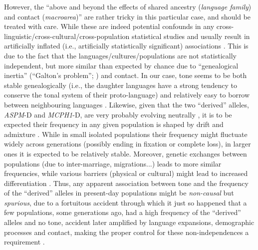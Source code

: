 \documentclass[twoside,twocolumn]{article}
\begin{document}
However, the ``above and beyond the effects of shared ancestry (\textit{language family}) and contact (\textit{macroarea})'' are rather tricky in this particular case, and should be treated with care.
While these are indeed potential confounds in any cross-linguistic/cross-cultural/cross-population statistical studies and usually result in artificially inflated (i.e., artificially statistically significant) associations \citep{ladd_correlational_2015}.
This is due to the fact that the languages/cultures/populations are not statistically independent, but more similar than expected by chance due to ``genealogical inertia'' (``Galton's problem''; \citealp{mace_galtonproblem_1994}) and contact.
In our case, tone seems to be both stable genealogically (i.e., the daughter languages have a strong tendency to conserve the tonal system of their proto-language) and relatively easy to borrow between neighbouring languages \citep{yip_tone_2002,dediu_procb_2011,dediu_cysouw_2013,kauhanen_geospatial_2018,collins_tone_2016}.
Likewise, given that the two ``derived'' alleles, \textit{ASPM}-D and \textit{MCPH1}-D, are very probably evolving neutrally \citep{currat_comment_2006}, it is to be expected their frequency in any given population is shaped by drift and admixture \citep{jobling_human_2013}.
While in small isolated populations their frequency might fluctuate widely across generations (possibly ending in fixation or complete loss), in larger ones it is expected to be relatively stable.
Moreover, genetic exchanges between populations (due to inter-marriage, migrations...) leads to more similar frequencies, while various barriers (physical or cultural) might lead to increased differentiation \citep{jobling_human_2013,reich_who_2018}.
Thus, any apparent association between tone and the frequency of the ``derived'' alleles in present-day populations might be \emph{non-causal} but \emph{spurious}, due to a fortuitous accident through which it just so happened that a few populations, some generations ago, had a high frequency of the ``derived'' alleles and no tone, accident later amplified by language expansions, demographic processes and contact, making the proper control for these non-independences a requirement \citep{roberts_traffic_2013,ladd_correlational_2015}.
\end{document}
